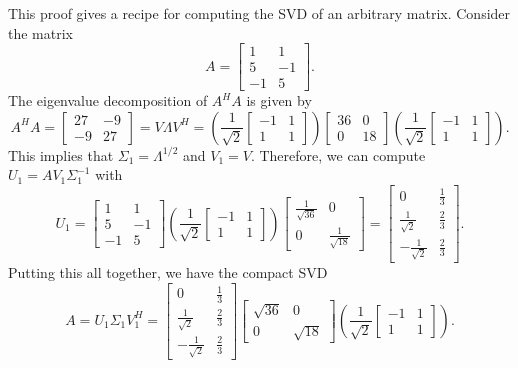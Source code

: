 This proof gives a recipe for computing the SVD of an arbitrary matrix.
Consider the matrix 
\[ A = \left[ \begin{array}{cc}
1 & 1 \\
5 & -1 \\
-1 & 5 
\end{array} \right]. \]
The eigenvalue decomposition of $A^H A$ is given by
\[ A^H A = \left[ \begin{array}{cc}
27 & -9 \\
-9 & 27
\end{array} \right]
= V \Lambda V^H
= \left( \frac{1}{\sqrt{2}}\left[ \begin{array}{cc}
-1 & 1 \\
1 & 1 
\end{array} \right] \right)
\left[ \begin{array}{cc}
36 & 0 \\
0 & 18
\end{array} \right]
\left( \frac{1}{\sqrt{2}} \left[ \begin{array}{cc}
-1 & 1 \\
1 & 1 
\end{array} \right] \right).
\]
This implies that $\Sigma_1 = \Lambda^{1/2}$ and $V_1 = V$.
Therefore, we can compute $U_1 = A V_1 \Sigma_1^{-1}$ with
\[ U_1 = \left[ \begin{array}{cc}
1 & 1 \\
5 & -1 \\
-1 & 5 
\end{array} \right]
\left( \frac{1}{\sqrt{2}} \left[ \begin{array}{cc}
-1 & 1 \\
1 & 1
\end{array} \right] \right)
\left[ \begin{array}{cc}
\frac{1}{\sqrt{36}} & 0 \\
0 & \frac{1}{\sqrt{18}}
\end{array} \right]
= \left[ \begin{array}{cc}
0 & \frac{1}{3} \\
\frac{1}{\sqrt{2}} & \frac{2}{3}  \\
-\frac{1}{\sqrt{2}} & \frac{2}{3} 
\end{array} \right]. \]
Putting this all together, we have the compact SVD
\[ A = U_1 \Sigma_1 V_1^H =
 \left[ \begin{array}{cc}
0 & \frac{1}{3} \\
\frac{1}{\sqrt{2}} & \frac{2}{3}  \\
-\frac{1}{\sqrt{2}} & \frac{2}{3} 
\end{array} \right]
\left[ \begin{array}{cc}
\sqrt{36} & 0 \\
0 & \sqrt{18}
\end{array} \right]
\left( \frac{1}{\sqrt{2}} \left[ \begin{array}{cc}
-1 & 1 \\
1 & 1 
\end{array} \right] \right). \]


